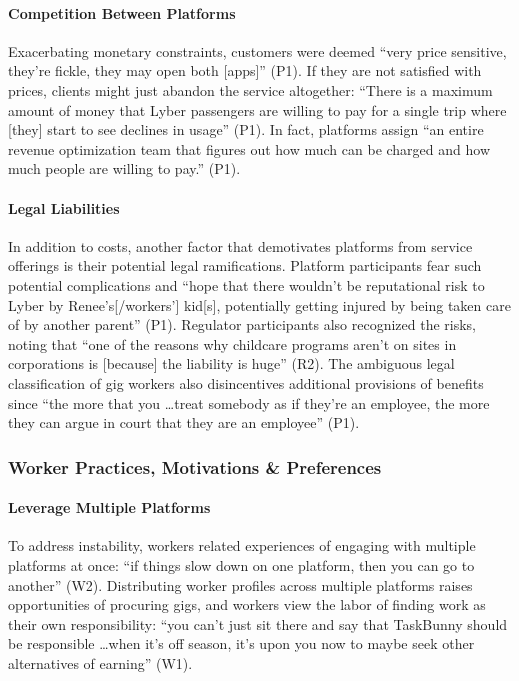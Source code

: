 \paragraph{Competition Between Platforms}
Exacerbating monetary constraints, customers were deemed ``very price sensitive, they're fickle, they may open both [apps]'' (P1). If they are not satisfied with prices, clients might just abandon the service altogether: ``There is a maximum amount of money that Lyber passengers are willing to pay for a single trip where [they] start to see declines in usage'' (P1). In fact, platforms assign ``an entire revenue optimization team that figures out how much can be charged and how much people are willing to pay.'' (P1).


\paragraph{Legal Liabilities} 
In addition to costs, another factor that demotivates platforms from service offerings is their potential legal ramifications. Platform participants fear such potential complications and ``hope that there wouldn't be reputational risk to Lyber by Renee's[/workers'] kid[s], potentially getting injured by being taken care of by another parent'' (P1). Regulator participants also recognized the risks, noting that ``one of the reasons why childcare programs aren't on sites in corporations is [because] the liability is huge'' (R2). 
The ambiguous legal classification of gig workers also disincentives additional provisions of benefits since ``the more that you \dots treat somebody as if they're an employee, the more they can argue in court that they are an employee'' (P1). 

\subsubsection{Worker Practices, Motivations \& Preferences}
\paragraph{Leverage Multiple Platforms} \label{multiapp}
To address instability, workers related experiences of engaging with multiple platforms at once: ``if things slow down on one platform, then you can go to another'' (W2). Distributing worker profiles across multiple platforms raises opportunities of procuring gigs, and workers view the labor of finding work as their own responsibility: ``you can't just sit there and say that TaskBunny should be responsible \dots when it's off season, it's upon you now to maybe seek other alternatives of earning'' (W1).

